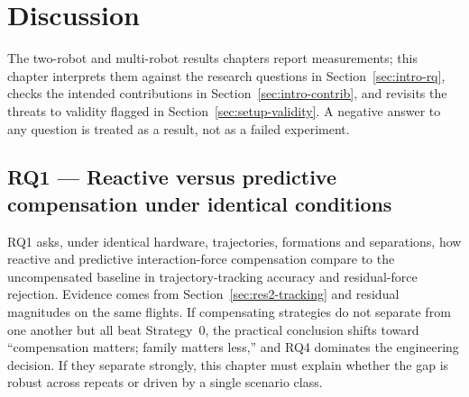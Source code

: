 %
%
%

\chapter{Discussion}
\label{ch:discussion}

The two-robot and multi-robot results chapters report measurements; this chapter interprets them
against the research questions in Section~\ref{sec:intro-rq}, checks the intended contributions in
Section~\ref{sec:intro-contrib}, and revisits the threats to validity flagged in
Section~\ref{sec:setup-validity}. A negative answer to any question is treated as a result, not as
a failed experiment.

\section{RQ1 --- Reactive versus predictive compensation under identical conditions}
\label{sec:disc-rq1}

RQ1 asks, under identical hardware, trajectories, formations and separations, how reactive and
predictive interaction-force compensation compare to the uncompensated baseline in trajectory-tracking
accuracy and residual-force rejection. Evidence comes from Section~\ref{sec:res2-tracking} and
residual magnitudes on the same flights. If compensating strategies do not separate from one another
but all beat Strategy~0, the practical conclusion shifts toward ``compensation matters; family
matters less,'' and RQ4 dominates the engineering decision. If they separate strongly, this chapter
must explain whether the gap is robust across repeats or driven by a single scenario class.


